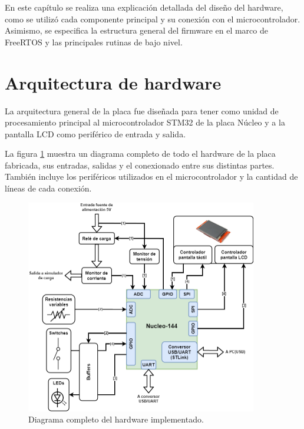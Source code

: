 
En este capítulo se realiza una explicación detallada del diseño del hardware, como se utilizó cada componente principal y su conexión con el microcontrolador. Asimismo, se especifica la estructura general del firmware en el marco de FreeRTOS y las principales rutinas de bajo nivel.


\section{Arquitectura de hardware}

La arquitectura general de la placa fue diseñada para tener como unidad de procesamiento principal al microcontrolador STM32 de la placa Núcleo y a la pantalla LCD como periférico de entrada y salida.

La figura \ref{fig:estrucInt} muestra un diagrama completo de todo el hardware de la placa fabricada, sus entradas, salidas y el conexionado entre sus distintas partes. También incluye los periféricos utilizados en el microcontrolador y la cantidad de líneas de cada conexión.

\begin{figure}[H]
\centering
\includegraphics[width=0.9\textwidth]{./Figures/diagDisp.png}
\caption{Diagrama completo del hardware implementado.}
\label{fig:estrucInt}
\end{figure}

